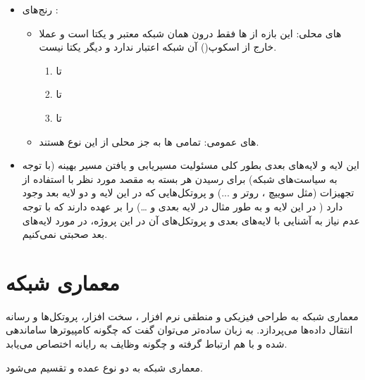 \documentclass[]{article}
\begin{document}
\begin{itemize}

\newpage
\item
رنج‌های :

\begin{itemize}
\item
{} های محلی: این بازه از  ها فقط درون همان شبکه معتبر و یکتا است و عملا خارج از اسکوپ() آن شبکه اعتبار ندارد و دیگر یکتا نیست.

\begin{enumerate}

\item
{} تا 

\item
{} تا 

\item
{} تا 

\end{enumerate}

\item

 های عمومی: تمامی  ها به جز  محلی از این نوع هستند.

\end{itemize}

\item
 این لایه و لایه‌های بعدی بطور کلی مسئولیت مسیریابی و یافتن مسیر بهینه (با توجه به سیاست‌های شبکه) برای رسیدن هر بسته به مقصد مورد نظر با استفاده از تجهیزات (مثل سوییچ ، روتر و ...‌)‌ و پروتکل‌هایی که در این لایه و دو لایه بعد وجود دارد ( در این لایه و به طور مثال  در لایه بعدی و …) را بر عهده دارند که با توجه عدم نیاز به آشنایی با لایه‌های بعدی و پروتکل‌های آن در این پروژه، در مورد لایه‌های بعد صحبتی نمی‌کنیم.
\end{itemize}

\newpage
\section*{{\titr معماری شبکه}}

معماری شبکه به طراحی فیزیکی و منطقی نرم افزار ، سخت افزار، پروتکل‌ها و رسانه انتقال داده‌ها می‌پردازد. به زبان ساده‌تر می‌توان گفت که چگونه کامپیوترها ساماندهی شده و با هم ارتباط گرفته و چگونه وظایف به رایانه اختصاص می‌یابد.

معماری شبکه به دو نوع عمده
 \href{https://en.wikipedia.org/wiki/Peer-to-peer}{\textcolor{blue}{\underline{}}}
 و
  \href{https://en.wikipedia.org/wiki/Client%E2%80%93server_model}{\textcolor{blue}{\underline{\lr{Client-Server}}}}
   تقسیم می‌شود.
\end{document}
